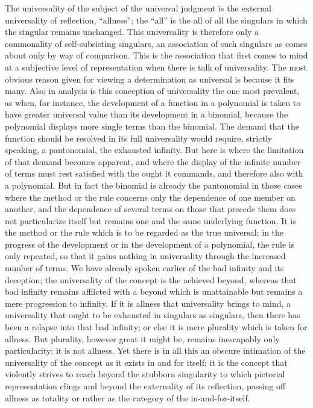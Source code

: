 The universality of the subject of the universal judgment is
the external universality of reflection, “allness”;
the “all” is the all of all the singulars
in which the singular remains unchanged.
This universality is therefore only
a commonality of self-subsisting singulars,
an association of such singulars
as comes about only by way of comparison.
This is the association that first comes to mind
at a subjective level of representation
when there is talk of universality.
The most obvious reason given for viewing a determination
as universal is because it fits many.
Also in analysis is this conception of universality
the one most prevalent, as when, for instance,
the development of a function in a polynomial is
taken to have greater universal value than
its development in a binomial,
because the polynomial displays
more single terms than the binomial.
The demand that the function should be resolved
in its full universality would require, strictly speaking,
a pantonomial, the exhausted infinity.
But here is where the limitation of
that demand becomes apparent,
and where the display of the infinite number of terms
must rest satisfied with the ought it commands,
and therefore also with a polynomial.
But in fact the binomial is already the pantonomial
in those cases where the method or the rule concerns
only the dependence of one member on another,
and the dependence of several terms on
those that precede them does not particularize itself
but remains one and the same underlying function.
It is the method or the rule
which is to be regarded as the true universal;
in the progress of the development
or in the development of a polynomial,
the rule is only repeated,
so that it gains nothing in universality
through the increased number of terms.
We have already spoken earlier of
the bad infinity and its deception;
the universality of the concept is the achieved beyond,
whereas that bad infinity remains afflicted with a beyond
which is unattainable but remains a mere progression to infinity.
If it is allness that universality brings to mind,
a universality that ought to be exhausted in singulars as singulars,
then there has been a relapse into that bad infinity;
or else it is mere plurality which is taken for allness.
But plurality, however great it might be,
remains inescapably only particularity:
it is not allness.
Yet there is in all this an obscure intimation of
the universality of the concept
as it exists in and for itself;
it is the concept that violently strives
to reach beyond the stubborn singularity
to which pictorial representation clings
and beyond the externality of its reflection,
passing off allness as totality
or rather as the category of the in-and-for-itself.

